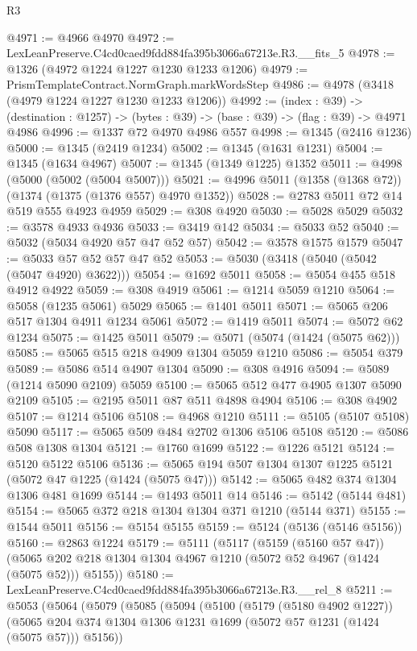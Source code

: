 \begin{lexlean}{R3}
\begin{coremodule}
@4971 := @4966 @4970
@4972 := LexLeanPreserve.C4cd0caed9fdd884fa395b3066a67213e.R3.__fits_5
@4978 := @1326 (@4972 @1224 @1227 @1230 @1233 @1206)
@4979 := PrismTemplateContract.NormGraph.markWordsStep
@4986 := @4978 (@3418 (@4979 @1224 @1227 @1230 @1233 @1206))
@4992 := (index : @39) ->
  (destination : @1257) -> (bytes : @39) -> (base : @39) -> (flag : @39) -> @4971 @4986
@4996 := @1337 @72 @4970 @4986 @557
@4998 := @1345 (@2416 @1236)
@5000 := @1345 (@2419 @1234)
@5002 := @1345 (@1631 @1231)
@5004 := @1345 (@1634 @4967)
@5007 := @1345 (@1349 @1225) @1352
@5011 := @4998 (@5000 (@5002 (@5004 @5007)))
@5021 := @4996 @5011 (@1358 (@1368 @72)) (@1374 (@1375 (@1376 @557) @4970 @1352))
@5028 := @2783 @5011 @72 @14 @519 @555 @4923 @4959
@5029 := @308 @4920
@5030 := @5028 @5029
@5032 := @3578 @4933 @4936
@5033 := @3419 @142
@5034 := @5033 @52
@5040 := @5032 (@5034 @4920 @57 @47 @52 @57)
@5042 := @3578 @1575 @1579
@5047 := @5033 @57 @52 @57 @47 @52
@5053 := @5030 (@3418 (@5040 (@5042 (@5047 @4920) @3622)))
@5054 := @1692 @5011
@5058 := @5054 @455 @518 @4912 @4922
@5059 := @308 @4919
@5061 := @1214 @5059 @1210
@5064 := @5058 (@1235 @5061) @5029
@5065 := @1401 @5011
@5071 := @5065 @206 @517 @1304 @4911 @1234 @5061
@5072 := @1419 @5011
@5074 := @5072 @62 @1234
@5075 := @1425 @5011
@5079 := @5071 (@5074 (@1424 (@5075 @62)))
@5085 := @5065 @515 @218 @4909 @1304 @5059 @1210
@5086 := @5054 @379
@5089 := @5086 @514 @4907 @1304
@5090 := @308 @4916
@5094 := @5089 (@1214 @5090 @2109) @5059
@5100 := @5065 @512 @477 @4905 @1307 @5090 @2109
@5105 := @2195 @5011 @87 @511 @4898 @4904
@5106 := @308 @4902
@5107 := @1214 @5106
@5108 := @4968 @1210
@5111 := @5105 (@5107 @5108) @5090
@5117 := @5065 @509 @484 @2702 @1306 @5106 @5108
@5120 := @5086 @508 @1308 @1304
@5121 := @1760 @1699
@5122 := @1226 @5121
@5124 := @5120 @5122 @5106
@5136 := @5065 @194 @507 @1304 @1307 @1225 @5121 (@5072 @47 @1225 (@1424 (@5075 @47)))
@5142 := @5065 @482 @374 @1304 @1306 @481 @1699
@5144 := @1493 @5011 @14
@5146 := @5142 (@5144 @481)
@5154 := @5065 @372 @218 @1304 @1304 @371 @1210 (@5144 @371)
@5155 := @1544 @5011
@5156 := @5154 @5155
@5159 := @5124 (@5136 (@5146 @5156))
@5160 := @2863 @1224
@5179 := @5111
    (@5117
      (@5159 (@5160 @57 @47))
      (@5065 @202 @218 @1304 @1304 @4967 @1210 (@5072 @52 @4967 (@1424 (@5075 @52))) @5155))
@5180 := LexLeanPreserve.C4cd0caed9fdd884fa395b3066a67213e.R3.__rel_8
@5211 := @5053
    (@5064
      (@5079
        (@5085
          (@5094
            (@5100
              (@5179 (@5180 @4902 @1227))
              (@5065 @204 @374 @1304 @1306 @1231 @1699 (@5072 @57 @1231 (@1424 (@5075 @57))) @5156))

\end{coremodule}
\end{lexlean}
